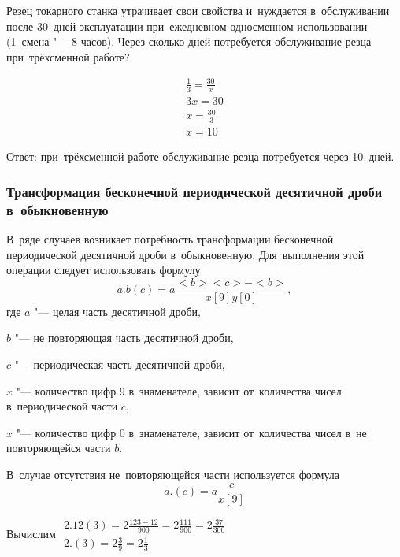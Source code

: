 \documentclass[]{scrartcl}
\begin{document}
\begin{Thexmpl}\label{ex:inv-prop}
Резец токарного станка утрачивает свои свойства и~нуждается в~обслуживании после 30~дней эксплуатации при~ежедневном односменном использовании (1~смена "--- 8 часов). Через сколько дней потребуется обслуживание резца при~трёхсменной работе?

\begin{equation*}\label{}
\begin{aligned}
\frac{1}{3}=\frac{30}{x} \\
3x = 30 \\
x = \frac{30}{3} \\
x = 10
\end{aligned}
\end{equation*}

Ответ: при~трёхсменной работе обслуживание резца потребуется через 10~дней.
\end{Thexmpl}

\subsubsection{Трансформация бесконечной периодической десятичной дроби в~обыкновенную}

В~ряде случаев возникает потребность трансформации бесконечной периодической десятичной дроби в~обыкновенную. Для~выполнения этой операции следует использовать формулу
\begin{equation}\label{eq:periodic-to-frac-1}
a.b(c)=a\frac{<b><c>-<b>}{x[9]y[0]},
\end{equation}
где $a$ "--- целая часть десятичной дроби,

$b$ "--- не повторяющая часть десятичной дроби,

$c$ "--- периодическая часть десятичной дроби,

$x$ "--- количество цифр 9 в~знаменателе, зависит от~количества чисел в~периодической части $c$,

$x$ "--- количество цифр 0 в~знаменателе, зависит от~количества чисел в~не повторяющейся части $b$.

В~случае отсутствия не~повторяющейся части используется формула
\begin{equation}\label{eq:periodic-to-frac-2}
a.(c)=a\frac{c}{x[9]}
\end{equation}

\begin{Thexmpl}\label{ex:periodic-to-frac-2}
	Вычислим
	$\begin{aligned}
		2.12(3) = 2\frac{123-12}{900} = 2\frac{111}{900} = 2\frac{37}{300} \\
		2.(3) = 2\frac{3}{9} =2\frac{1}{3} 
	\end{aligned}$
	
\end{Thexmpl}
\end{document}
